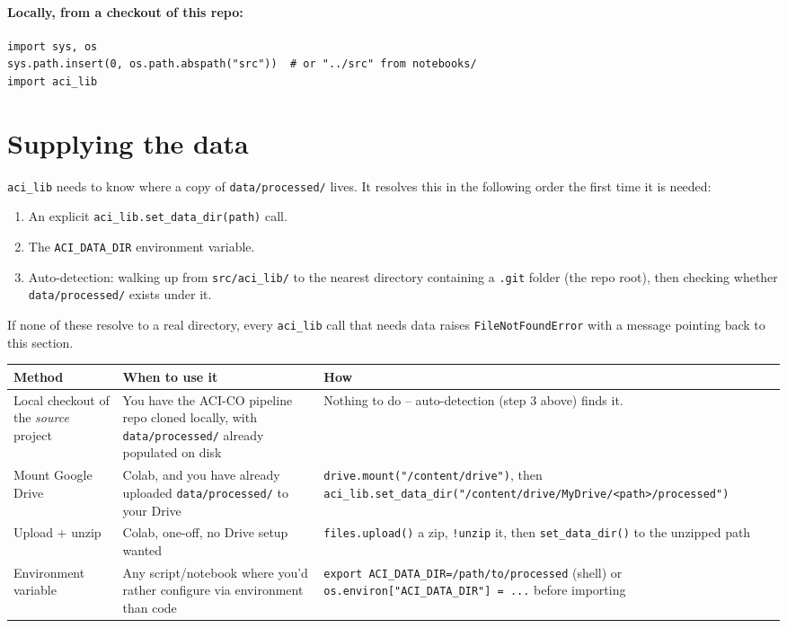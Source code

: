 \documentclass[11pt]{article}
\begin{document}
\paragraph{Locally, from a checkout of this repo:}
\begin{lstlisting}
import sys, os
sys.path.insert(0, os.path.abspath("src"))  # or "../src" from notebooks/
import aci_lib
\end{lstlisting}

\section{Supplying the data}
\label{sec:data-supply}

\texttt{aci\_lib} needs to know where a copy of \texttt{data/processed/}
lives. It resolves this in the following order the first time it is
needed:

\begin{enumerate}[leftmargin=*]
\item An explicit \texttt{aci\_lib.set\_data\_dir(path)} call.
\item The \texttt{ACI\_DATA\_DIR} environment variable.
\item Auto-detection: walking up from \texttt{src/aci\_lib/} to the nearest
  directory containing a \texttt{.git} folder (the repo root), then
  checking whether \texttt{data/processed/} exists under it.
\end{enumerate}

If none of these resolve to a real directory, every \texttt{aci\_lib} call
that needs data raises \texttt{FileNotFoundError} with a message pointing
back to this section.

\begin{longtable}{@{}L{3.0cm}L{5.3cm}L{5.7cm}@{}}
\toprule
\textbf{Method} & \textbf{When to use it} & \textbf{How} \\
\midrule
\endhead
Local checkout of the \emph{source} project & You have the ACI-CO pipeline repo cloned locally, with \texttt{data/processed/} already populated on disk & Nothing to do -- auto-detection (step 3 above) finds it. \\
Mount Google Drive & Colab, and you have already uploaded \texttt{data/processed/} to your Drive & \texttt{drive.mount(\allowbreak"/content/drive")}, then \texttt{aci\_lib.set\_data\_dir(\allowbreak"/content/drive/MyDrive/\allowbreak <path>/processed")} \\
Upload + unzip & Colab, one-off, no Drive setup wanted & \texttt{files.upload()} a zip, \texttt{!unzip} it, then \texttt{set\_data\_dir()} to the unzipped path \\
Environment variable & Any script/notebook where you'd rather configure via environment than code & \texttt{export ACI\_DATA\_DIR=/path/to/processed} (shell) or \texttt{os.environ["ACI\_DATA\_DIR"] = ...} before importing \\
\bottomrule
\end{longtable}
\end{document}
